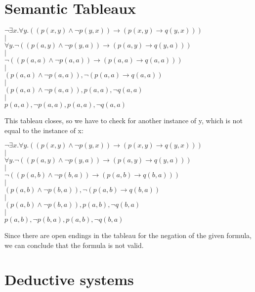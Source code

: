 \documentclass[]{article}
\begin{document}
\section{Semantic Tableaux}
\begin{center}
$\neg\exists x.\forall y.((p(x,y) \wedge \neg p(y,x))\rightarrow (p(x,y) \rightarrow q(y,x)))$
\\$|$\\
$\forall y.\neg((p(a,y) \wedge \neg p(y,a))\rightarrow (p(a,y) \rightarrow q(y,a)))$
\\$|$\\
$\neg ((p(a,a) \wedge \neg p(a,a))\rightarrow (p(a,a) \rightarrow q(a,a)))$
\\$|$\\
$(p(a,a) \wedge \neg p(a,a)), \neg(p(a,a) \rightarrow q(a,a))$
\\$|$\\
$(p(a,a) \wedge \neg p(a,a)), p(a,a), \neg q(a,a)$
\\$|$\\
$p(a,a), \neg p(a,a), p(a,a), \neg q(a,a)$
\end{center}
\noindent This tableau closes, so we have to check for another instance of y, which is not equal to the instance of x:
\\
\begin{center}
$\neg\exists x.\forall y.((p(x,y) \wedge \neg p(y,x))\rightarrow (p(x,y) \rightarrow q(y,x)))$
\\$|$\\
$\forall y.\neg((p(a,y) \wedge \neg p(y,a))\rightarrow (p(a,y) \rightarrow q(y,a)))$
\\$|$\\
$\neg ((p(a,b) \wedge \neg p(b,a))\rightarrow (p(a,b) \rightarrow q(b,a)))$
\\$|$\\
$(p(a,b) \wedge \neg p(b,a)), \neg(p(a,b) \rightarrow q(b,a))
$\\$|$\\
$(p(a,b) \wedge \neg p(b,a)), p(a,b), \neg q(b,a)$
\\$|$\\
$p(a,b), \neg p(b,a), p(a,b), \neg q(b,a)$
\end{center}
\noindent Since there are open endings in the tableau for the negation of the given formula, we can conclude that the formula is not valid.

\section{Deductive systems}
\end{document}
